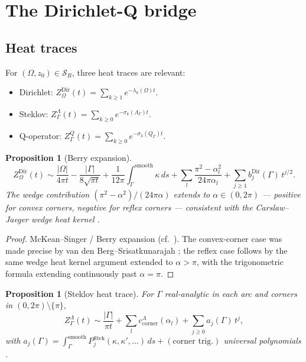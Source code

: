 \documentclass[11pt,reqno]{amsart}
\theoremstyle{plain}
\newtheorem{proposition}[theorem]{Proposition}
\theoremstyle{definition}
\theoremstyle{remark}
\newcommand{\Scal}{\mathcal{S}}
\newcommand{\Qop}{Q}
\newcommand{\Lambdaop}{\Lambda}
\begin{document}
\section{The Dirichlet-Q bridge}\label{sec:bridge}

\subsection{Heat traces}\label{ss:heat-traces}

For $(\Omega, z_0) \in \Scal_R$, three heat traces are relevant:
\begin{itemize}
\item Dirichlet: $Z_\Omega^{\mathrm{Dir}}(t) = \sum_{k\geq 1} e^{-\lambda_k(\Omega) t}$.
\item Steklov: $Z_\Gamma^{\Lambdaop}(t) = \sum_{k\geq 0} e^{-\sigma_k(\Lambdaop_\Gamma)t}$.
\item Q-operator: $Z_\Gamma^{\Qop}(t) = \sum_{k\geq 0} e^{-\sigma_k(\Qop_\Gamma)t}$.
\end{itemize}

\begin{proposition}[Berry expansion]\label{prop:berry}
\[
Z_\Omega^{\mathrm{Dir}}(t) \sim \frac{|\Omega|}{4\pi t} - \frac{|\Gamma|}{8\sqrt{\pi t}} + \frac{1}{12\pi}\int_\Gamma^{\mathrm{smooth}}\kappa\,ds + \sum_l \frac{\pi^2 - \alpha_l^2}{24\pi\alpha_l} + \sum_{j\geq 1}b_j^{\mathrm{Dir}}(\Gamma)\,t^{j/2}.
\]
The wedge contribution $(\pi^2 - \alpha^2)/(24\pi\alpha)$ extends to $\alpha \in (0, 2\pi)$ — positive for convex corners, negative for reflex corners — consistent with the Carslaw--Jaeger wedge heat kernel \cite{Carslaw}.
\end{proposition}

\begin{proof}
McKean--Singer / Berry expansion (cf.\ \cite[\S 4.2]{Polterovich-survey}). The convex-corner case was made precise by van den Berg--Srisatkunarajah \cite{vdBSr}; the reflex case follows by the same wedge heat kernel argument extended to $\alpha > \pi$, with the trigonometric formula extending continuously past $\alpha = \pi$.
\end{proof}

\begin{proposition}[Steklov heat trace]\label{prop:steklov}
For $\Gamma$ real-analytic in each arc and corners in $(0,2\pi)\setminus\{\pi\}$,
\[
Z_\Gamma^{\Lambdaop}(t) \sim \frac{|\Gamma|}{\pi t} + \sum_l c^{\Lambdaop}_{\mathrm{corner}}(\alpha_l) + \sum_{j\geq 0} a_j(\Gamma)\,t^j,
\]
with $a_j(\Gamma) = \int_\Gamma^{\mathrm{smooth}} P_j^{\mathrm{Stek}}(\kappa, \kappa', \dots)\,ds + (\text{corner trig.})$ universal polynomials \cite{Edward, PolterovichSher, LPPS-corners}.
\end{proposition}
\end{document}
